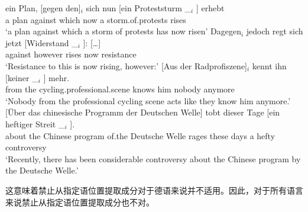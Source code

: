 \begin{sloppypar}
\ex 
\gll ein Plan, [gegen den]$_i$ sich nun [ein Proteststurm \_$_i$ ] erhebt\footnotemark\\
     a plan \spacebr{}against which  now \spacebr{}a storm.of.protests {} {} rises\\
\glt `a plan against which a storm of protests has now risen'
\ex 
\gll {}Dagegen$_i$ jedoch regt sich jetzt [Widerstand \_$_i$ ]: [\ldots]\footnotemark\\
	{}against however rises  now \spacebr{}resistance {}\\
\glt `Resistance to this is now rising, however:'
\largerpage[2]
\ex
\gll {}[Aus der Radprofiszene]$_i$ kennt ihn [keiner \_$_i$ ] mehr.\footnotemark\\
	 {}\spacebr{}from the cycling.professional.scene knows him \spacebr{}nobody {} {} anymore\\
\glt `Nobody from the professional cycling scene acts like they know him anymore.'
\ex 
\gll {}[Über das chinesische Programm der Deutschen Welle] tobt dieser Tage [ein heftiger Streit \_$_i$ ].\footnotemark\\
     \spacebr{}about the Chinese program of.the Deutsche Welle rages these days \spacebr{}a hefty controversy\\
\glt `Recently, there has been considerable controversy about the Chinese program by the Deutsche Welle.'
\zl
\end{sloppypar}

\noindent
这意味着禁止从指定语位置提取成分对于德语来说并不适用。因此，对于所有语言来说禁止从指定语位置提取成分也不对。

